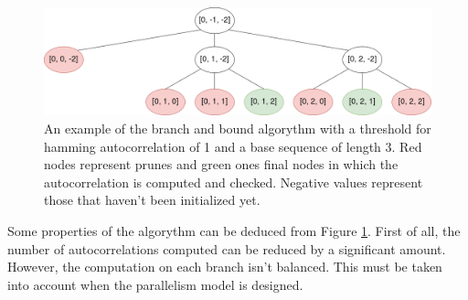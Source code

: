   \begin{figure}[ht!]
    \begin{center}
      \includegraphics[scale=0.4]{Chapters/Implementation/Example_branch_bound.png}
    \end{center}
    \caption{An example of the branch and bound algorythm with a threshold for
    hamming autocorrelation of 1 and a base sequence of length 3. Red nodes
    represent prunes and green ones final nodes in which the
    autocorrelation is computed and checked. Negative values represent those
    that haven't been initialized yet.}
    \label{bb:fig:1}
  \end{figure}

  Some properties of the algorythm can be deduced from Figure \ref{bb:fig:1}.
  First of all, the number of autocorrelations computed can be reduced by a
  significant amount. However, the computation on each branch isn't balanced. This
  must be taken into account when the parallelism model is designed.
